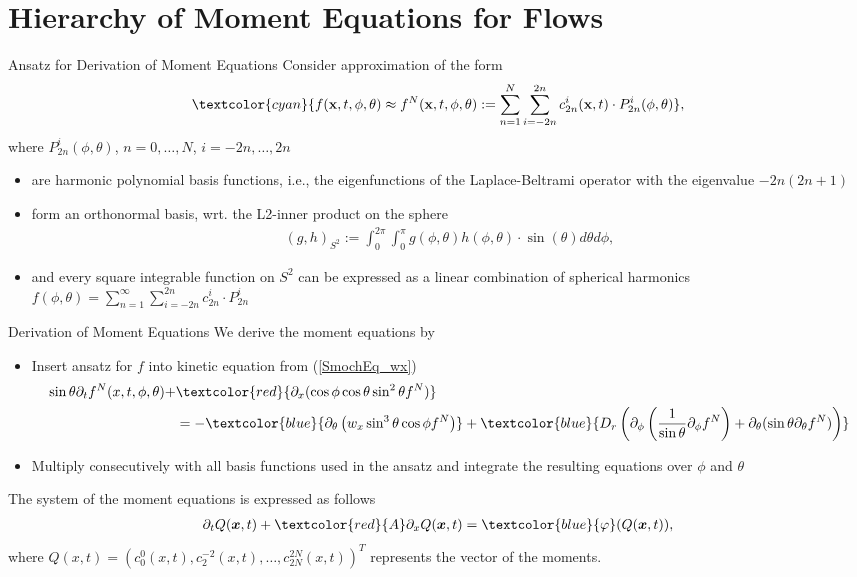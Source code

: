 \section{Hierarchy of Moment Equations for Flows}
\begin{frame}{Ansatz for Derivation of Moment Equations}
	\scriptsize
    Consider approximation of the form
	\begin{align}
		\textcolor{cyan}{f(\textbf{x}, t, \phi, \theta) \approx f^N(\textbf{x},t,\phi,\theta) :=  \sum_{n=1}^{N} \sum_{i=-2n}^{2n} c^i_{2n}(\textbf{x},t) \cdot P^i_{2n}(\phi, \theta)}, \label{spectralmethod}
	\end{align}
	where $P^i_{2n}(\phi, \theta)$, $n = 0, \ldots, N$, $i = -2n, \ldots, 2n$
	\begin{itemize}
		\item are harmonic polynomial basis functions, i.e., the eigenfunctions of the Laplace-Beltrami operator with the eigenvalue $-2n(2n+1)$
		\pause
		\item form an orthonormal basis, wrt. the L2-inner product on the sphere
		\begin{align*}
			(g,h)_{S^2} := \int_{0}^{2\pi} \int_{0}^{\pi} g(\phi, \theta) h(\phi, \theta) \cdot \sin(\theta) d\theta d\phi,
		\end{align*}
	\pause
	\item and every square integrable function on $S^2$ can be expressed as a linear combination of spherical harmonics $f(\phi, \theta) = \sum^{\infty}_{n=1} \sum_{i=-2n}^{2n} c^i_{2n} \cdot P^i_{2n}$
	\end{itemize}
\end{frame}

\begin{frame}{Derivation of Moment Equations}
	\scriptsize
	We derive the moment equations by
	\begin{itemize}
		\item Insert ansatz for $f$ into kinetic equation from (\ref{SmochEq_wx}) 
\begin{align*}
\sin\theta \partial_{t}f^N(x,t,\phi,\theta) + &  \textcolor{red}{\partial_x (\cos\phi \cos\theta \sin^2\theta f^N)} \\
	& 
	 =- \textcolor{blue}{\partial_\theta \left(w_x \sin^3 \theta \cos \phi f^N\right)} +\textcolor{blue}{D_{r} \left( \partial_\phi \left(\frac{1}{\sin \theta} \partial_\phi f^N \right) + \partial_\theta (\sin \theta \partial_\theta f^N) \right)}
\end{align*}
		\item Multiply consecutively with all basis functions used in the ansatz and integrate the resulting equations over $\phi$ and $\theta$
	\end{itemize}
\pause
The system of the moment equations is expressed as follows
\begin{align}
	\partial_t Q(\boldsymbol{x},t) + \textcolor{red}{A}\partial_x Q(\boldsymbol{x},t) = \textcolor{blue}{\varphi} (Q(\boldsymbol{x},t)),
\end{align}
where $Q(x,t)=(c^0_0(x,t), c^{-2}_2(x,t), \ldots, c^{2N}_{2N}(x,t))^T$ represents the vector of the moments. 
\end{frame}

